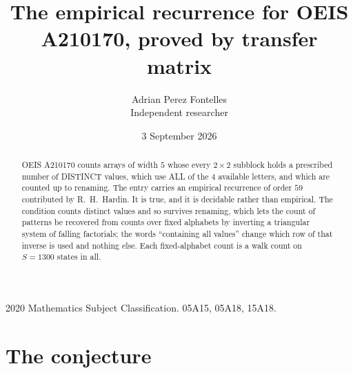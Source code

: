 \documentclass[11pt,a4paper]{article}
\title{The empirical recurrence for OEIS A210170, proved by transfer matrix}
\author{Adrian Perez Fontelles\\ \small Independent researcher}
\date{3 September 2026}
\theoremstyle{plain}
\theoremstyle{definition}
\begin{document}
\maketitle

\begin{abstract}
OEIS A210170 counts arrays of width $5$ whose every $2\times2$ subblock holds a
prescribed number of DISTINCT values, which use ALL of the $4$ available letters, and which
are counted up to renaming. The entry carries an empirical recurrence of order $59$
contributed by R.~H.~Hardin. It is true, and it is decidable rather than empirical. The
condition counts distinct values and so survives renaming, which lets the count of patterns be
recovered from counts over fixed alphabets by inverting a triangular system of falling
factorials; the words ``containing all values'' change which row of that inverse is used and
nothing else. Each fixed-alphabet count is a walk count on $S=1300$ states in all.
\end{abstract}

\noindent\small 2020 Mathematics Subject Classification. 05A15, 05A18, 15A18.\normalsize

\section{The conjecture}
\end{document}

